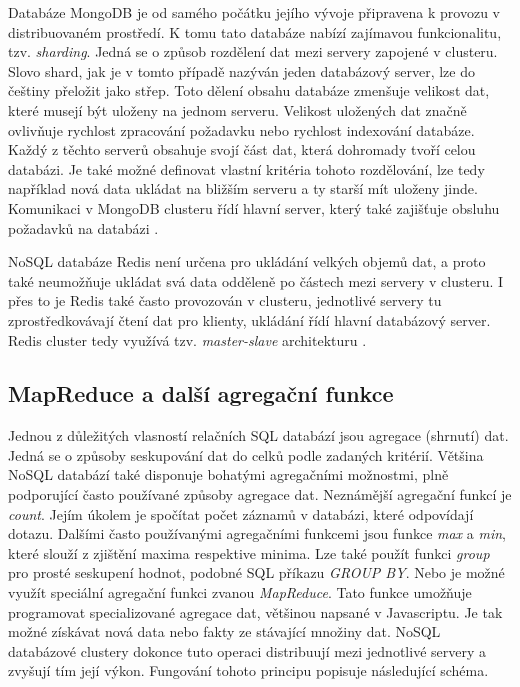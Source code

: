 Databáze MongoDB je od samého počátku jejího vývoje připravena k provozu v distribuovaném prostředí. K tomu tato databáze nabízí zajímavou funkcionalitu, tzv. \emph{sharding}. Jedná se o způsob rozdělení dat mezi servery zapojené v clusteru. Slovo shard, jak je v tomto případě nazýván jeden databázový server, lze do češtiny přeložit jako střep. Toto dělení obsahu databáze zmenšuje velikost dat, které musejí být uloženy na jednom serveru. Velikost uložených dat značně ovlivňuje rychlost zpracování požadavku nebo rychlost indexování databáze. Každý z těchto serverů obsahuje svojí část dat, která dohromady tvoří celou databázi. Je také možné definovat vlastní kritéria tohoto rozdělování, lze tedy například nová data ukládat na bližším serveru a ty starší mít uloženy jinde. Komunikaci v MongoDB clusteru řídí hlavní server, který také zajišťuje obsluhu požadavků na databázi \cite{mongoCluster}.

NoSQL databáze Redis není určena pro ukládání velkých objemů dat, a proto také neumožňuje ukládat svá data odděleně po částech mezi servery v clusteru. I přes to je Redis také často provozován v clusteru, jednotlivé servery tu zprostředkovávají čtení dat pro klienty, ukládání řídí hlavní databázový server. Redis cluster tedy využívá tzv. \emph{master-slave} architekturu  \cite{panykoNosql}.
\subsection{MapReduce a další agregační funkce}

Jednou z důležitých vlasností relačních SQL databází jsou agregace (shrnutí) dat. Jedná se o způsoby seskupování dat do celků podle zadaných kritérií. Většina NoSQL databází také disponuje bohatými agregačními možnostmi, plně podporující často používané způsoby agregace dat. Neznámější agregační funkcí je \emph{count}. Jejím úkolem je spočítat počet záznamů v databázi, které odpovídají dotazu. Dalšími často používanými agregačními funkcemi jsou funkce \emph{max} a \emph{min}, které slouží z zjištění maxima respektive minima. Lze také použít funkci \emph{group} pro prosté seskupení hodnot, podobné SQL příkazu \emph{GROUP BY}. Nebo je možné využít speciální agregační funkci zvanou \emph{MapReduce}. Tato funkce umožňuje programovat specializované agregace dat, většinou napsané v Javascriptu. Je tak možné získávat nová data nebo fakty ze stávající množiny dat. NoSQL databázové clustery dokonce tuto operaci distribuují mezi jednotlivé servery a zvyšují tím její výkon. Fungování tohoto principu popisuje následující schéma.


